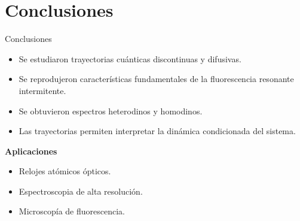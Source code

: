 \documentclass[aspectratio=169]{beamer}
\begin{document}
\section{Conclusiones}

\begin{frame}{Conclusiones}

\begin{itemize}
\item Se estudiaron trayectorias cuánticas discontinuas y difusivas.
\item Se reprodujeron características fundamentales de la fluorescencia resonante intermitente.
\item Se obtuvieron espectros heterodinos y homodinos.
\item Las trayectorias permiten interpretar la dinámica condicionada del sistema.
\end{itemize}

\vspace{0.3cm}

\textbf{Aplicaciones}

\begin{itemize}
\item Relojes atómicos ópticos.
\item Espectroscopia de alta resolución.
\item Microscopía de fluorescencia.
\end{itemize}
\end{frame}
\end{document}
